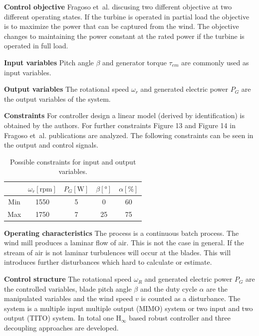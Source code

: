 \textbf{Control objective} Fragoso  et~al. discusing two different objective at two different operating states.
If the turbine is operated in partial load the objective is to maximize the power that can be captured from the wind.
The objective changes to maintaining the power constant at the rated power if the turbine is operated in full load.

\textbf{Input variables} Pitch angle $\beta$ and generator torque $\tau_{em}$ are commonly used as input variables. 

\textbf{Output variables} The rotational speed $\omega_r$ and generated electric power $P_G$ are the output variables of the system.

\textbf{Constraints} For controller design a linear model (derived by identification) is obtained by the authors. 
For further constraints Figure 13 and Figure 14 in Fragoso  et~al. publications are analyzed.
The following constraints can be seen in the output and control signals.

\begin{table}[H]
    \label{tab:constraints}
    \caption{Possible constraints for input and output variables.}
    \centering
    \begin{tabular}{ccccc} \toprule
            & $\omega_r \left[\text{rpm}\right]$ & $P_G \left[\si{\watt}\right]$ & $\beta \left[\si{\degree}\right]$ & $\alpha \left[\text{\%}\right]$ \\ \midrule
        Min & 1550 & 5 & 0  & 60 \\
        Max & 1750 & 7 & 25 & 75 \\ \bottomrule
    \end{tabular}
\end{table}


\textbf{Operating characteristics} The process is a continuous batch process.
The wind mill produces a laminar flow of air.
This is not the case in general.
If the stream of air is not laminar turbulences will occur at the blades.
This will introduces further disturbances which hard to calculate or estimate.

\textbf{Control structure}
The rotational speed $\omega_R$ and generated electric power $P_G$ are the controlled variables, blade pitch angle $\beta$ and the duty cycle $\alpha$ are the manipulated variables and the wind speed $v$ is counted as a disturbance.
The system is a multiple input multiple output (MIMO) system or two input and two output (TITO) system.
In total one $\text{H}_{\infty}$ based robust controller and three decoupling approaches are developed. 

